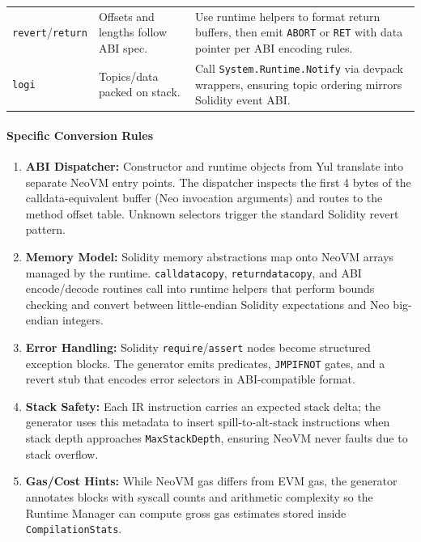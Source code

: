 \documentclass[11pt]{article}
\begin{document}
\begin{table}[H]
\begin{tabularx}{\textwidth}{@{}p{}p{}X@{}}
\texttt{revert}/\texttt{return} & Offsets and lengths follow ABI spec. & Use runtime helpers to format return buffers, then emit \texttt{ABORT} or \texttt{RET} with data pointer per ABI encoding rules.\\
\texttt{log{i}} & Topics/data packed on stack. & Call \texttt{System.Runtime.Notify} via devpack wrappers, ensuring topic ordering mirrors Solidity event ABI.\\
\bottomrule
\end{tabularx}
\end{table}

\paragraph{Specific Conversion Rules}
\begin{enumerate}
    \item \textbf{ABI Dispatcher:} Constructor and runtime objects from Yul translate into separate NeoVM entry points. The dispatcher inspects the first 4 bytes of the calldata-equivalent buffer (Neo invocation arguments) and routes to the method offset table. Unknown selectors trigger the standard Solidity revert pattern.
    \item \textbf{Memory Model:} Solidity memory abstractions map onto NeoVM arrays managed by the runtime. \texttt{calldatacopy}, \texttt{returndatacopy}, and ABI encode/decode routines call into runtime helpers that perform bounds checking and convert between little-endian Solidity expectations and Neo big-endian integers.
    \item \textbf{Error Handling:} Solidity \texttt{require}/\texttt{assert} nodes become structured exception blocks. The generator emits predicates, \texttt{JMPIFNOT} gates, and a revert stub that encodes error selectors in ABI-compatible format.
    \item \textbf{Stack Safety:} Each IR instruction carries an expected stack delta; the generator uses this metadata to insert spill-to-alt-stack instructions when stack depth approaches \texttt{MaxStackDepth}, ensuring NeoVM never faults due to stack overflow.
    \item \textbf{Gas/Cost Hints:} While NeoVM gas differs from EVM gas, the generator annotates blocks with syscall counts and arithmetic complexity so the Runtime Manager can compute gross gas estimates stored inside \texttt{CompilationStats}.
\end{enumerate}
\end{document}
